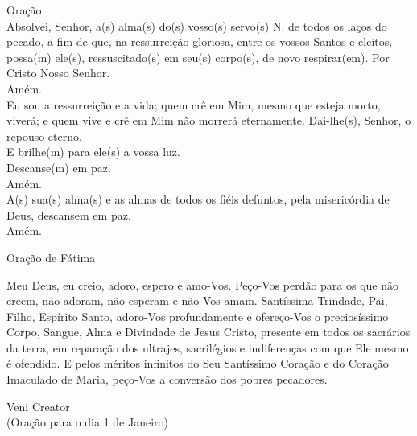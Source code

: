 \documentclass{book}
\begin{document}
\begin{flushleft}
    Oração
    \vspace{.2cm} \\
    Absolvei, Senhor, a(s) alma(s) do(s) vosso(s) servo(s) \textcolor{VioletRed2}{N.} de todos os laços do pecado, a fim de que, na ressurreição gloriosa, entre os vossos Santos e eleitos, possa(m) ele(s), ressuscitado(s) em seu(s) corpo(s), de novo respirar(em). Por Cristo Nosso Senhor. \\
    \RbarRed{} Amém.
    \vspace{.2cm} \\
    \VbarRed{} Eu sou a ressurreição e a vida; quem crê em Mim, mesmo que esteja morto, viverá; e quem vive e crê em Mim não morrerá eternamente. Dai-lhe(s), Senhor, o repouso eterno. \\
    \RbarRed{} E brilhe(m) para ele(s) a vossa luz.
    \vspace{.2cm} \\
    \VbarRed{} Descanse(m) em paz. \\
    \RbarRed{} Amém.
    \vspace{.2cm} \\
    \VbarRed{} A(s) sua(s) alma(s) e as almas de todos os fiéis defuntos, pela misericórdia de Deus, descansem em paz. \\
    \RbarRed{} Amém.
\end{flushleft}
\begin{center}
    Oração de Fátima
\end{center}
\begin{flushleft}
    Meu Deus, eu creio, adoro, espero e amo-Vos. Peço-Vos perdão para os que não creem, não adoram, não esperam e não Vos amam. Santíssima Trindade, Pai, Filho, Espírito Santo, adoro-Vos profundamente e ofereço-Vos o preciosíssimo Corpo, Sangue, Alma e Divindade de Jesus Cristo, presente em todos os sacrários da terra, em reparação dos ultrajes, sacrilégios e indiferenças com que Ele mesmo é ofendido. E pelos méritos infinitos do Seu Santíssimo Coração e do Coração Imaculado de Maria, peço-Vos a conversão dos pobres pecadores.
\end{flushleft}
\begin{center}
    Veni Creator \\ \textcolor{VioletRed2}{\scriptsize{(Oração para o dia 1 de Janeiro)}}
\end{center}
\end{document}
